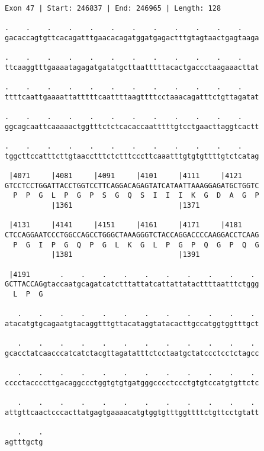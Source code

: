 \documentclass{article}
\begin{document}
\begin{Verbatim}[fontfamily=courier]
Exon 47 | Start: 246837 | End: 246965 | Length: 128

.    .    .    .    .    .    .    .    .    .    .    .    
gacaccagtgttcacagatttgaacacagatggatgagactttgtagtaactgagtaaga

.    .    .    .    .    .    .    .    .    .    .    .    
ttcaaggtttgaaaatagagatgatatgcttaatttttacactgaccctaagaaacttat

.    .    .    .    .    .    .    .    .    .    .    .    
ttttcaattgaaaattatttttcaattttaagttttcctaaacagatttctgttagatat

.    .    .    .    .    .    .    .    .    .    .    .    
ggcagcaattcaaaaactggtttctctcacaccaatttttgtcctgaacttaggtcactt

.    .    .    .    .    .    .    .    .    .    .    .    
tggcttccatttcttgtaacctttctctttcccttcaaatttgtgtgttttgtctcatag

 |4071     |4081     |4091     |4101     |4111     |4121    
GTCCTCCTGGATTACCTGGTCCTTCAGGACAGAGTATCATAATTAAAGGAGATGCTGGTC
  P  P  G  L  P  G  P  S  G  Q  S  I  I  I  K  G  D  A  G  P
           |1361                         |1371              

 |4131     |4141     |4151     |4161     |4171     |4181    
CTCCAGGAATCCCTGGCCAGCCTGGGCTAAAGGGTCTACCAGGACCCCAAGGACCTCAAG
  P  G  I  P  G  Q  P  G  L  K  G  L  P  G  P  Q  G  P  Q  G
           |1381                         |1391              

 |4191       .    .    .    .    .    .    .    .    .    . 
GCTTACCAGgtaccaatgcagatcatctttattatcattattatacttttaatttctggg
  L  P  G                                                   

   .    .    .    .    .    .    .    .    .    .    .    . 
atacatgtgcagaatgtacaggtttgttacataggtatacacttgccatggtggtttgct

   .    .    .    .    .    .    .    .    .    .    .    . 
gcacctatcaacccatcatctacgttagatatttctcctaatgctatccctcctctagcc

   .    .    .    .    .    .    .    .    .    .    .    . 
cccctaccccttgacaggccctggtgtgtgatgggcccctccctgtgtccatgtgttctc

   .    .    .    .    .    .    .    .    .    .    .    . 
attgttcaactcccacttatgagtgaaaacatgtggtgtttggttttctgttcctgtatt

   .    .
agtttgctg
\end{Verbatim}
\newpage
\end{document}
